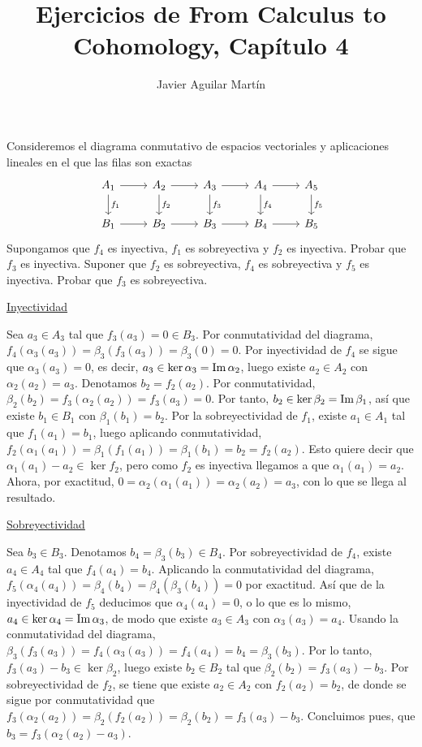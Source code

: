 \documentclass[twoside]{article}
\begin{document}
\title{Ejercicios de From Calculus to Cohomology, Capítulo 4}
\author{Javier Aguilar Martín}
\maketitle


\begin{ejercicio}{4.1}
Consideremos el diagrama conmutativo de espacios vectoriales y aplicaciones lineales en el que las filas son exactas
\[
\begin{tikzcd}
A_1\arrow[d,"f_1"]\arrow[r] & A_2\arrow[d,"f_2"]\arrow[r] & A_3\arrow[d,"f_3"]\arrow[r] & A_4\arrow[d,"f_4"]\arrow[r] & A_5\arrow[d,"f_5"]\\
B_1\arrow[r] & B_2\arrow[r] & B_3\arrow[r] & B_4\arrow[r] & B_5
\end{tikzcd}
\]
Supongamos que $f_4$ es inyectiva, $f_1$ es sobreyectiva y $f_2$ es inyectiva. Probar que $f_3$ es inyectiva. Suponer que $f_2$ es sobreyectiva, $f_4$ es sobreyectiva y $f_5$ es inyectiva. Probar que $f_3$ es sobreyectiva. 
\end{ejercicio}
\begin{solucion}
\underline{Inyectividad}

Sea $a_3\in A_3$ tal que $f_3(a_3)=0\in B_3$. Por conmutatividad del diagrama, $f_4(\alpha_3(a_3))=\beta_3(f_3(a_3))=\beta_3(0)=0$. Por inyectividad de $f_4$ se sigue que $\alpha_3(a_3)=0$, es decir, $a_3\in\ker{\alpha_3}=\operatorname{Im}{\alpha_2}$, luego existe $a_2\in A_2$ con $\alpha_2(a_2)=a_3$. Denotamos $b_2=f_2(a_2)$. Por conmutatividad, $\beta_2(b_2)=f_3(\alpha_2(a_2))=f_3(a_3)=0$. Por tanto, $b_2\in\ker{\beta_2}=\operatorname{Im}{\beta_1}$, así que existe $b_1\in B_1$ con $\beta_1(b_1)=b_2$. Por la sobreyectividad de $f_1$, existe $a_1\in A_1$ tal que $f_1(a_1)=b_1$, luego aplicando conmutatividad, $f_2(\alpha_1(a_1))=\beta_1(f_1(a_1))=\beta_1(b_1)=b_2=f_2(a_2)$. Esto quiere decir que $\alpha_1(a_1)-a_2\in\ker{f_2}$, pero como $f_2$ es inyectiva llegamos a que $\alpha_1(a_1)=a_2$. Ahora, por exactitud, $0=\alpha_2(\alpha_1(a_1))=\alpha_2(a_2)=a_3$, con lo que se llega al resultado.

\underline{Sobreyectividad}

Sea $b_3\in B_3$. Denotamos $b_4=\beta_3(b_3)\in B_4$. Por sobreyectividad de $f_4$, existe $a_4\in A_4$ tal que $f_4(a_4)=b_4$. Aplicando la conmutatividad del diagrama, $f_5(\alpha_4(a_4))=\beta_4(b_4)=\beta_4(\beta_3(b_4))=0$ por exactitud. Así que de la inyectividad de $f_5$ deducimos que $\alpha_4(a_4)=0$, o lo que es lo mismo, $a_4\in\ker{\alpha_4}=\operatorname{Im}{\alpha_3}$, de modo que existe $a_3\in A_3$ con $\alpha_3(a_3)=a_4$. Usando la conmutatividad del diagrama, $\beta_3(f_3(a_3))=f_4(\alpha_3(a_3))=f_4(a_4)=b_4=\beta_3(b_3)$. Por lo tanto, $f_3(a_3)-b_3\in\ker{\beta_2}$, luego existe $b_2\in B_2$ tal que $\beta_2(b_2)=f_3(a_3)-b_3$. Por sobreyectividad de $f_2$, se tiene que existe $a_2\in A_2$ con $f_2(a_2)=b_2$, de donde se sigue por conmutatividad que $f_3(\alpha_2(a_2))=\beta_2(f_2(a_2))=\beta_2(b_2)=f_3(a_3)-b_3$. Concluimos pues, que $b_3=f_3(\alpha_2(a_2)-a_3)$.
\end{solucion}
\end{document}
